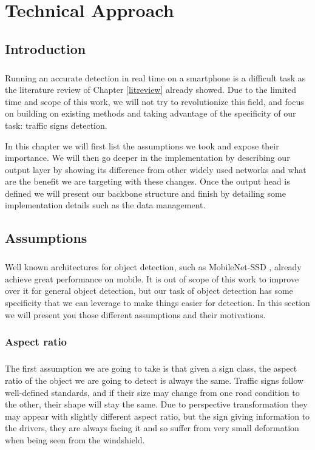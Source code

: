 \chapter{Technical Approach} \label{chapter:technicalApproach}

\section{Introduction}
\paragraph{}
Running an accurate detection in real time on a smartphone is a difficult task as the literature review of Chapter \ref{litreview} already showed. Due to the limited time and scope of this work, we will not try to revolutionize this field, and focus on building on existing methods and taking advantage of the specificity of our task: traffic signs detection.

In this chapter we will first list the assumptions we took and expose their importance. We will then go deeper in the implementation by describing our output layer by showing its difference from other widely used networks and what are the benefit we are targeting with these changes. Once the output head is defined we will present our backbone structure and finish by detailing some implementation details such as the data management.

\section{Assumptions} \label{Assumptions}
\paragraph{}
Well known architectures for object detection, such as MobileNet-SSD \cite{sandler2018mobilenetv2}, already achieve great performance on mobile. It is out of scope of this work to improve over it for general object detection, but our task of object detection has some specificity that we can leverage to make things easier for detection. In this section we will present you those different assumptions and their motivations.

\subsection{Aspect ratio} \label{assumptionAspectRatio}
\paragraph{}
The first assumption we are going to take is that given a sign class, the aspect ratio of the object we are going to detect is always the same. Traffic signs follow well-defined standards, and if their size may change from one road condition to the other, their shape will stay the same. Due to perspective transformation they may appear with slightly different aspect ratio, but the sign giving information to the drivers, they are always facing it and so suffer from very small deformation when being seen from the windshield.

